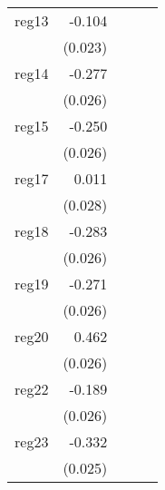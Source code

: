{\begin{longtable}{l*{4}{D{.}{.}{-1}}}
\addlinespace
reg13       &      -0.104\sym{***}&                     &                     &                     \\
            &     (0.023)         &                     &                     &                     \\
\addlinespace
reg14       &      -0.277\sym{***}&                     &                     &                     \\
            &     (0.026)         &                     &                     &                     \\
\addlinespace
reg15       &      -0.250\sym{***}&                     &                     &                     \\
            &     (0.026)         &                     &                     &                     \\
\addlinespace
reg17       &       0.011         &                     &                     &                     \\
            &     (0.028)         &                     &                     &                     \\
\addlinespace
reg18       &      -0.283\sym{***}&                     &                     &                     \\
            &     (0.026)         &                     &                     &                     \\
\addlinespace
reg19       &      -0.271\sym{***}&                     &                     &                     \\
            &     (0.026)         &                     &                     &                     \\
\addlinespace
reg20       &       0.462\sym{***}&                     &                     &                     \\
            &     (0.026)         &                     &                     &                     \\
\addlinespace
reg22       &      -0.189\sym{***}&                     &                     &                     \\
            &     (0.026)         &                     &                     &                     \\
\addlinespace
reg23       &      -0.332\sym{***}&                     &                     &                     \\
            &     (0.025)         &                     &                     &                     \\

\end{longtable}}
